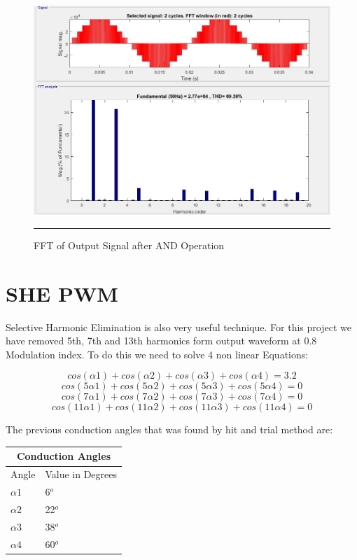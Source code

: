 \begin{figure}[htbp]
	\centering
	\includegraphics[width = 6in]{./Figures/Photos/Simulink/And_SPWM_Out_FFT.jpg}
	\rule{35em}{1pt}
	\caption{FFT of Output Signal after AND Operation}
\end{figure}

\section{SHE PWM}
Selective Harmonic Elimination is also very useful technique. For this project we have removed 5th, 7th and 13th harmonics form output waveform at 0.8 Modulation index. To do this we need to solve 4 non linear Equations:

\begin{equation}
cos(\alpha1) + cos(\alpha2) + cos(\alpha3) + cos(\alpha4) = 3.2
\end{equation}
\begin{equation}
cos(5\alpha1) + cos(5\alpha2) + cos(5\alpha3) + cos(5\alpha4) = 0
\end{equation}
\begin{equation}
cos(7\alpha1) + cos(7\alpha2) + cos(7\alpha3) + cos(7\alpha4) = 0
\end{equation}
\begin{equation}
cos(11\alpha1) + cos(11\alpha2) + cos(11\alpha3) + cos(11\alpha4) = 0
\end{equation}

\newpage
The previous conduction angles that was found by hit and trial method are:

\begin{center}
	\begin{tabular}{ |p{4cm}||p{4cm}|  }
		\hline
		\multicolumn{2}{|c|}{Conduction Angles} \\
		\hline
		Angle & Value in Degrees\\
		\hline
		$\alpha1$ & 6$^o$\\
		\hline
		$\alpha2$ & 22$^o$\\
		\hline
		$\alpha3$ & 38$^o$\\
		\hline
		$\alpha4$ & 60$^o$\\
		\hline
	\end{tabular}
\end{center}

